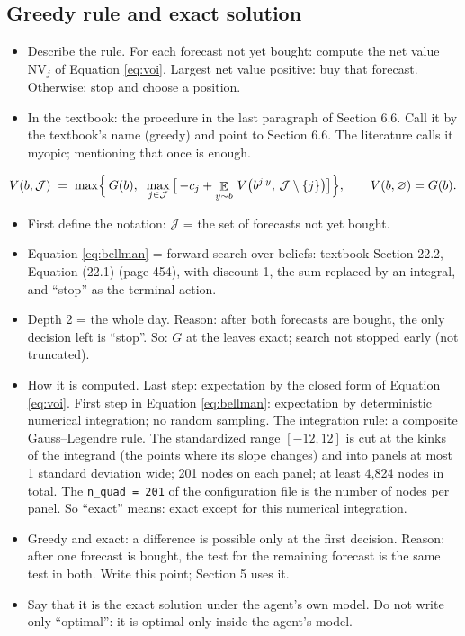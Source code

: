 \documentclass{article}
\newenvironment{pts}{\begin{itemize}[nosep,leftmargin=1.15em,topsep=1pt]}{\end{itemize}}
\newcommand{\rest}{\mathcal{J}}          %
\DeclareMathOperator{\E}{\mathbb{E}}
\begin{document}
\subsection{Greedy rule and exact solution}

\begin{note}
\begin{pts}
\item Describe the rule. For each forecast not yet bought: compute the net value $\mathrm{NV}_j$ of Equation \eqref{eq:voi}. Largest net value positive: buy that forecast. Otherwise: stop and choose a position.
\item In the textbook: the procedure in the last paragraph of Section 6.6. Call it by the textbook's name (greedy) and point to Section 6.6. The literature calls it myopic; mentioning that once is enough.
\end{pts}
\end{note}

\begin{equation}
V(b, \rest) \;=\; \max\Bigl\{\, G(b),\;\; \max_{j \in \rest}\,\bigl[\, -c_j + \E_{y \sim b}\, V\bigl(b^{j,y},\, \rest \setminus \{j\}\bigr) \bigr] \Bigr\},
\qquad V(b, \varnothing) = G(b).
\label{eq:bellman}
\end{equation}

\begin{note}
\begin{pts}
\item First define the notation: $\rest$ = the set of forecasts not yet bought.
\item Equation \eqref{eq:bellman} = forward search over beliefs: textbook Section 22.2, Equation (22.1) (page 454), with discount 1, the sum replaced by an integral, and ``stop'' as the terminal action.
\item Depth 2 = the whole day. Reason: after both forecasts are bought, the only decision left is ``stop''. So: $G$ at the leaves exact; search not stopped early (not truncated).
\item How it is computed. Last step: expectation by the closed form of Equation \eqref{eq:voi}. First step in Equation \eqref{eq:bellman}: expectation by deterministic numerical integration; no random sampling. The integration rule: a composite Gauss--Legendre rule. The standardized range $[-12, 12]$ is cut at the kinks of the integrand (the points where its slope changes) and into panels at most 1 standard deviation wide; 201 nodes on each panel; at least 4{,}824 nodes in total. The \texttt{n\_quad = 201} of the configuration file is the number of nodes per panel. So ``exact'' means: exact except for this numerical integration.
\item Greedy and exact: a difference is possible only at the first decision. Reason: after one forecast is bought, the test for the remaining forecast is the same test in both. Write this point; Section 5 uses it.
\item Say that it is the exact solution under the agent's own model. Do not write only ``optimal'': it is optimal only inside the agent's model.
\end{pts}
\end{note}
\end{document}
